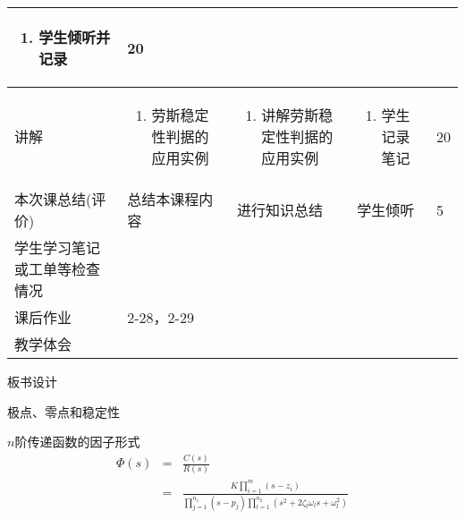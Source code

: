 {\begin{landscape}
\begin{longtable}{|m{10mm}|m{50mm}|m{50mm}|m{50mm}|m{15mm}|}
\begin{enumerate}
\item 学生倾听并记录
\end{enumerate} &20 \\\hline
讲解&\begin{enumerate}
\item 劳斯稳定性判据的应用实例
\end{enumerate}
 &\begin{enumerate}
\item 讲解劳斯稳定性判据的应用实例
\end{enumerate} &\begin{enumerate}
\item 学生记录笔记
\end{enumerate} &20 \\\hline

\centering 本次课总结(评价)&总结本课程内容 &进行知识总结 &学生倾听 &5 \\\hline
\centering 学生学习笔记或工单等检查情况&\multicolumn{4}{m{165mm}|}{\quad}\\\hline
\centering 课后作业&\multicolumn{4}{m{165mm}|}{2-28，2-29}\\\hline
\centering 教学体会&\multicolumn{4}{m{165mm}|}{\quad}\\
\end{longtable}

\end{landscape}
\clearpage
\begin{center}
{\huge 板书设计}
\end{center}
}
 \begin{frame}{极点、零点和稳定性}
 \begin{block}{$n$阶传递函数的因子形式}
 \begin{eqnarray*}
 \Phi(s)&=&\frac{C(s)}{R(s)}\\
 &=&\frac{K\prod\limits_{i=1}^m(s-z_i)}{\prod\limits_{j=1}^{n_1}(s-p_j)\prod\limits_{l=1}^{n_2}(s^2+2\zeta_l\omega_ls+\omega_l^2)}
 \end{eqnarray*}
 \end{block}
 \end{frame}
 
